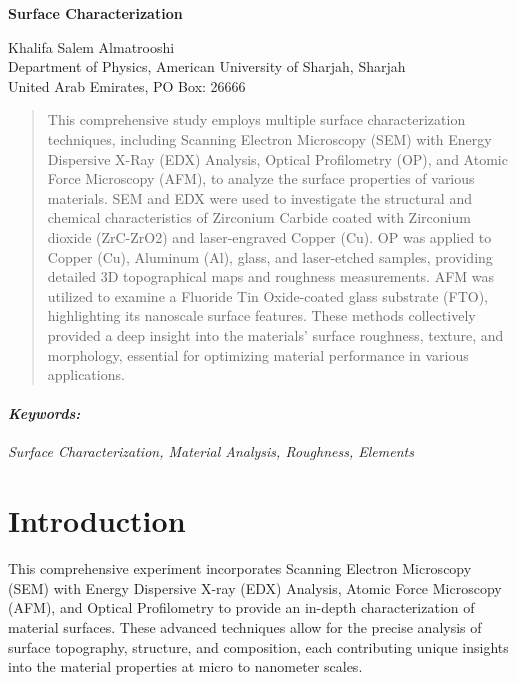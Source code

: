 \documentclass[11pt]{article}
\begin{document}
	
	\begin{titlepage}
		\begin{center}
			\begin{Large}
				\textbf{Surface Characterization} \\
			\end{Large}
			\vspace{0.5cm}
			Khalifa Salem Almatrooshi \\
			\vspace{0.5cm}
			Department of Physics, American University of Sharjah, Sharjah \\
			United Arab Emirates, PO Box: 26666
		\end{center}
		\begin{abstract}
			\noindent
			This comprehensive study employs multiple surface characterization techniques, including Scanning Electron Microscopy (SEM) with Energy Dispersive X-Ray (EDX) Analysis, Optical Profilometry (OP), and Atomic Force Microscopy (AFM), to analyze the surface properties of various materials. SEM and EDX were used to investigate the structural and chemical characteristics of Zirconium Carbide coated with Zirconium dioxide (ZrC-ZrO2) and laser-engraved Copper (Cu). OP was applied to Copper (Cu), Aluminum (Al), glass, and laser-etched samples, providing detailed 3D topographical maps and roughness measurements. AFM was utilized to examine a Fluoride Tin Oxide-coated glass substrate (FTO), highlighting its nanoscale surface features. These methods collectively provided a deep insight into the materials' surface roughness, texture, and morphology, essential for optimizing material performance in various applications.
		\end{abstract}
		\paragraph{\textit{Keywords:}} \textit{Surface Characterization, Material Analysis, Roughness, Elements}
	\end{titlepage}
	
\clearpage
	
	\section{Introduction}	
	
	This comprehensive experiment incorporates Scanning Electron Microscopy (SEM) with Energy Dispersive X-ray (EDX) Analysis, Atomic Force Microscopy (AFM), and Optical Profilometry to provide an in-depth characterization of material surfaces. These advanced techniques allow for the precise analysis of surface topography, structure, and composition, each contributing unique insights into the material properties at micro to nanometer scales.
	
\end{document}
